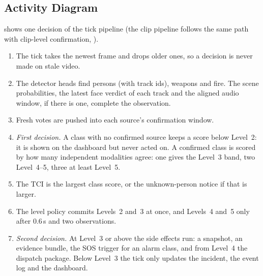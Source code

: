 \subsection{Activity Diagram}
 shows one decision of the tick pipeline (the clip pipeline follows the same path with clip-level confirmation, ).
\begin{enumerate}
\item The tick takes the newest frame and drops older ones, so a decision is never made on stale video.
\item The detector heads find persons (with track ids), weapons and fire. The scene probabilities, the latest face verdict of each track and the aligned audio window, if there is one, complete the observation.
\item Fresh votes are pushed into each source's confirmation window.
\item \emph{First decision.} A class with no confirmed source keeps a score below Level~2: it is shown on the dashboard but never acted on. A confirmed class is scored by how many independent modalities agree: one gives the Level~3 band, two Level~4--5, three at least Level~5.
\item The TCI is the largest class score, or the unknown-person notice if that is larger.
\item The level policy commits Levels~2 and~3 at once, and Levels~4 and~5 only after 0.6\,s and two observations.
\item \emph{Second decision.} At Level~3 or above the side effects run: a snapshot, an evidence bundle, the SOS trigger for an alarm class, and from Level~4 the dispatch package. Below Level~3 the tick only updates the incident, the event log and the dashboard.
\end{enumerate}

